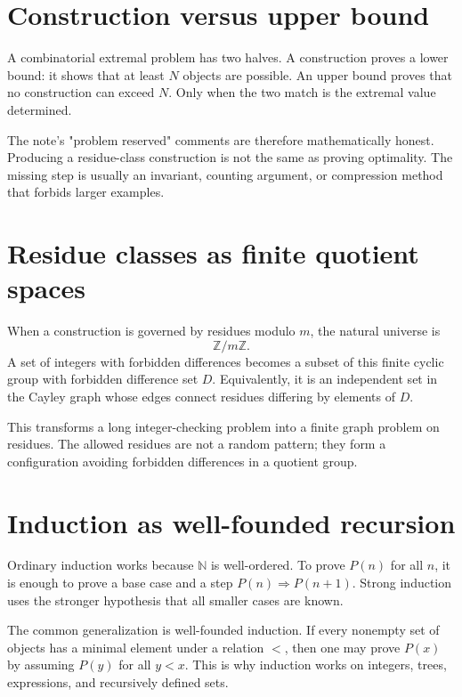 \section{Construction versus upper bound}

A combinatorial extremal problem has two halves.  A construction proves a lower bound: it shows that at least \(N\) objects are possible.  An upper bound proves that no construction can exceed \(N\).  Only when the two match is the extremal value determined.

The note's "problem reserved" comments are therefore mathematically honest.  Producing a residue-class construction is not the same as proving optimality.  The missing step is usually an invariant, counting argument, or compression method that forbids larger examples.

\section{Residue classes as finite quotient spaces}

When a construction is governed by residues modulo \(m\), the natural universe is
\[
  \mathbb Z/m\mathbb Z.
\]
A set of integers with forbidden differences becomes a subset of this finite cyclic group with forbidden difference set \(D\).  Equivalently, it is an independent set in the Cayley graph whose edges connect residues differing by elements of \(D\).

This transforms a long integer-checking problem into a finite graph problem on residues.  The allowed residues are not a random pattern; they form a configuration avoiding forbidden differences in a quotient group.

\section{Induction as well-founded recursion}

Ordinary induction works because \(\mathbb N\) is well-ordered.  To prove \(P(n)\) for all \(n\), it is enough to prove a base case and a step \(P(n)\Rightarrow P(n+1)\).  Strong induction uses the stronger hypothesis that all smaller cases are known.

The common generalization is well-founded induction.  If every nonempty set of objects has a minimal element under a relation \(<\), then one may prove \(P(x)\) by assuming \(P(y)\) for all \(y<x\).  This is why induction works on integers, trees, expressions, and recursively defined sets.

